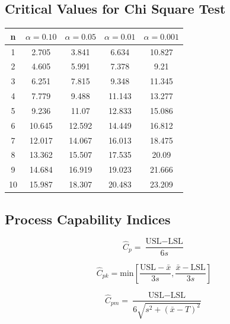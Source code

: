 \documentclass[a4paper,12pt]{article}
\begin{document}
\subsection*{Critical Values for Chi Square Test}
{
	\Large
\begin{center}
\begin{tabular}{|c|c|c|c|c|}
	\hline 
n	&	$\alpha=0.10$	&	$\alpha=0.05$	&	$\alpha=0.01$	&	$\alpha=0.001$	\\ \hline
1	& 	2.705	&	3.841	&	6.634	&	10.827	\\ \hline
2	&	4.605	&	5.991	&	7.378	&	9.21	\\ \hline
3	&	6.251	&	7.815	&	9.348	&	11.345	\\ \hline
4	&	7.779	&	9.488	&	11.143	&	13.277	\\ \hline
5	&	9.236	&	11.07	&	12.833	&	15.086	\\ \hline
6	&	10.645	&	12.592	&	14.449	&	16.812	\\ \hline
7	&	12.017	&	14.067	&	16.013	&	18.475	\\ \hline
8	&	13.362	&	15.507	&	17.535	&	20.09	\\ \hline
9	&	14.684	&	16.919	&	19.023	&	21.666	\\ \hline
10	&	15.987	&	18.307	&	20.483	&	23.209	\\ \hline
\end{tabular} 
\end{center}
}
\subsection*{Process Capability Indices}
\[ \hat{C}_p = \frac{\mbox{USL} - \mbox{LSL}}{6s}\]

\[ \hat{C}_{pk} = \mbox{min} \left[\frac{\mbox{USL} - \bar{x}}{3s},\frac{\bar{x} - \mbox{LSL}}{3s} \right] \]

\[ \hat{C}_{pm} = \frac{\mbox{USL} - \mbox{LSL}}{6\sqrt{s^2+(\bar{x}-T)^2}}\]
\bigskip
%
\end{document}
